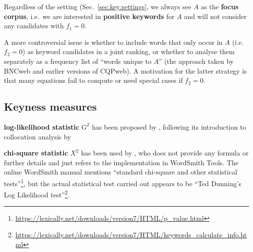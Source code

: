 \documentclass[a4paper]{article}
\newcommand{\LLR}{G^2}          %
\newcommand{\CHI}{X^2}          %
\begin{document}
Regardless of the setting (Sec.~\ref{sec:key:settings}, we always see $A$ as the \textbf{focus corpus}, i.e.\ we are interested in \textbf{positive keywords} for $A$ and will not consider any candidates with $f_1 = 0$.

A more controversial issue is whether to include words that only occur in $A$ (i.e.\ $f_2 = 0$) as keyword candidates in a joint ranking, or whether to analyse them separately as a frequency list of ``words unique to $A$'' (the approach taken by BNCweb and earlier versions of CQPweb).  A motivation for the latter strategy is that many equations fail to compute or need special cases if $f_2 = 0$.



\subsection{Keyness measures}
\label{sec:key:measures}

\textbf{log-likelihood statistic} $\LLR$ has been proposed by \citet[3]{Rayson:Garside:00}, following its introduction to collocation analysis by \citet{Dunning:93}

\textbf{chi-square statistic} $\CHI$ has been used by \citet[236]{Scott:97}, who does not provide any formula or further details and just refers to the implementation in WordSmith Tools.  The online WordSmith manual mentions ``standard chi-square and other statistical tests''\footnote{\url{https://lexically.net/downloads/version7/HTML/p_value.html}}, but the actual statistical test carried out appears to be ``Ted Dunning's Log Likelihood test''\footnote{\url{https://lexically.net/downloads/version7/HTML/keywords_calculate_info.html}}.

\todo[inline]{check out \citet{Oakes:Farrow:06} for $\CHI$-based keyword analysis}
\end{document}
